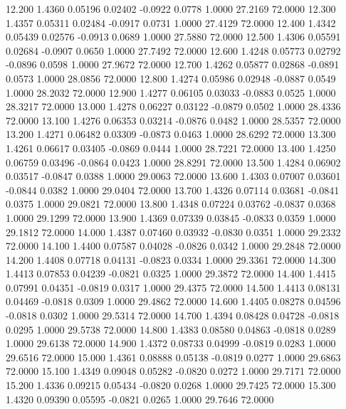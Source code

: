   12.200   1.4360   0.05196   0.02402  -0.0922   0.0778   1.0000  27.2169  72.0000
  12.300   1.4357   0.05311   0.02484  -0.0917   0.0731   1.0000  27.4129  72.0000
  12.400   1.4342   0.05439   0.02576  -0.0913   0.0689   1.0000  27.5880  72.0000
  12.500   1.4306   0.05591   0.02684  -0.0907   0.0650   1.0000  27.7492  72.0000
  12.600   1.4248   0.05773   0.02792  -0.0896   0.0598   1.0000  27.9672  72.0000
  12.700   1.4262   0.05877   0.02868  -0.0891   0.0573   1.0000  28.0856  72.0000
  12.800   1.4274   0.05986   0.02948  -0.0887   0.0549   1.0000  28.2032  72.0000
  12.900   1.4277   0.06105   0.03033  -0.0883   0.0525   1.0000  28.3217  72.0000
  13.000   1.4278   0.06227   0.03122  -0.0879   0.0502   1.0000  28.4336  72.0000
  13.100   1.4276   0.06353   0.03214  -0.0876   0.0482   1.0000  28.5357  72.0000
  13.200   1.4271   0.06482   0.03309  -0.0873   0.0463   1.0000  28.6292  72.0000
  13.300   1.4261   0.06617   0.03405  -0.0869   0.0444   1.0000  28.7221  72.0000
  13.400   1.4250   0.06759   0.03496  -0.0864   0.0423   1.0000  28.8291  72.0000
  13.500   1.4284   0.06902   0.03517  -0.0847   0.0388   1.0000  29.0063  72.0000
  13.600   1.4303   0.07007   0.03601  -0.0844   0.0382   1.0000  29.0404  72.0000
  13.700   1.4326   0.07114   0.03681  -0.0841   0.0375   1.0000  29.0821  72.0000
  13.800   1.4348   0.07224   0.03762  -0.0837   0.0368   1.0000  29.1299  72.0000
  13.900   1.4369   0.07339   0.03845  -0.0833   0.0359   1.0000  29.1812  72.0000
  14.000   1.4387   0.07460   0.03932  -0.0830   0.0351   1.0000  29.2332  72.0000
  14.100   1.4400   0.07587   0.04028  -0.0826   0.0342   1.0000  29.2848  72.0000
  14.200   1.4408   0.07718   0.04131  -0.0823   0.0334   1.0000  29.3361  72.0000
  14.300   1.4413   0.07853   0.04239  -0.0821   0.0325   1.0000  29.3872  72.0000
  14.400   1.4415   0.07991   0.04351  -0.0819   0.0317   1.0000  29.4375  72.0000
  14.500   1.4413   0.08131   0.04469  -0.0818   0.0309   1.0000  29.4862  72.0000
  14.600   1.4405   0.08278   0.04596  -0.0818   0.0302   1.0000  29.5314  72.0000
  14.700   1.4394   0.08428   0.04728  -0.0818   0.0295   1.0000  29.5738  72.0000
  14.800   1.4383   0.08580   0.04863  -0.0818   0.0289   1.0000  29.6138  72.0000
  14.900   1.4372   0.08733   0.04999  -0.0819   0.0283   1.0000  29.6516  72.0000
  15.000   1.4361   0.08888   0.05138  -0.0819   0.0277   1.0000  29.6863  72.0000
  15.100   1.4349   0.09048   0.05282  -0.0820   0.0272   1.0000  29.7171  72.0000
  15.200   1.4336   0.09215   0.05434  -0.0820   0.0268   1.0000  29.7425  72.0000
  15.300   1.4320   0.09390   0.05595  -0.0821   0.0265   1.0000  29.7646  72.0000
